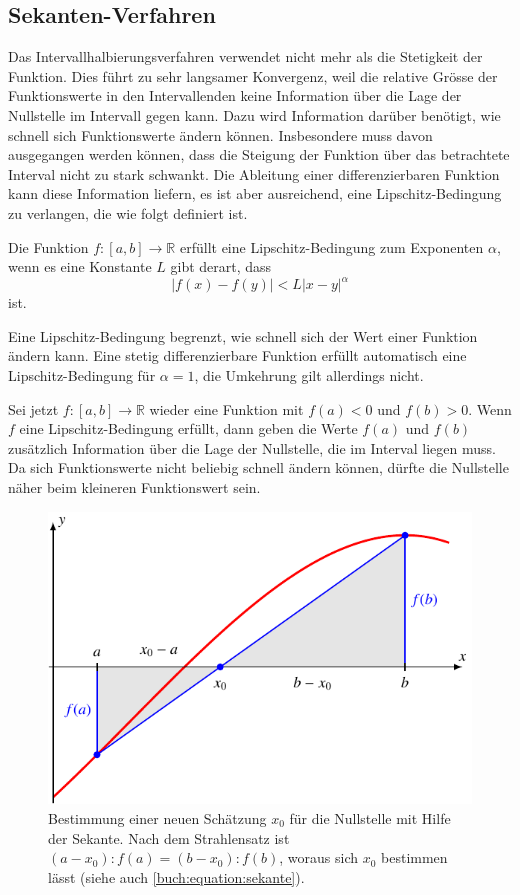 %
%
\subsection{Sekanten-Verfahren
\label{buch:subsection:sekanten}}
Das Intervallhalbierungsverfahren verwendet nicht mehr als die
Stetigkeit der Funktion.
Dies führt zu sehr langsamer Konvergenz, weil die relative Grösse
der Funktionswerte in den Intervallenden keine Information über die
Lage der Nullstelle im Intervall gegen kann.
Dazu wird Information darüber benötigt, wie schnell sich Funktionswerte
ändern können.
Insbesondere muss davon ausgegangen werden können, dass die Steigung
der Funktion über das betrachtete Interval nicht zu stark schwankt.
Die Ableitung einer differenzierbaren Funktion kann diese Information
liefern, es ist aber ausreichend, eine Lipschitz-Bedingung zu verlangen,
die wie folgt definiert ist.

\begin{definition}
\label{buch:definition:lipshitz}
Die Funktion $f\colon[a,b]\to\mathbb R$ erfüllt eine Lipschitz-Bedingung
zum Exponenten $\alpha$, wenn es eine Konstante $L$ gibt derart, dass
\[
|f(x)-f(y)|
<
L|x-y|^\alpha
\]
ist.
\end{definition}

Eine Lipschitz-Bedingung begrenzt, wie schnell sich der Wert
einer Funktion ändern kann.
Eine stetig differenzierbare Funktion erfüllt automatisch eine
Lipschitz-Bedingung für $\alpha=1$, die Umkehrung gilt allerdings
nicht.

Sei jetzt $f\colon[a,b]\to\mathbb R$ wieder eine Funktion mit
$f(a)<0$ und $f(b) > 0$.
Wenn $f$ eine Lipschitz-Bedingung erfüllt, dann geben die
Werte $f(a)$ und $f(b)$ zusätzlich Information über die Lage
der Nullstelle, die im Interval liegen muss.
Da sich Funktionswerte nicht beliebig schnell ändern können,
dürfte die Nullstelle näher beim kleineren Funktionswert sein.

\begin{figure}
\centering
\includegraphics{chapters/20-gleichungen/figures/sekante.pdf}
\caption{Bestimmung einer neuen Schätzung $x_0$ für die Nullstelle
mit Hilfe der Sekante.
Nach dem Strahlensatz ist $(a-x_0):f(a) = (b-x_0):f(b)$, woraus
sich $x_0$ bestimmen lässt (siehe auch \eqref{buch:equation:sekante}).
\label{buch:figure:sekante}}
\end{figure}

